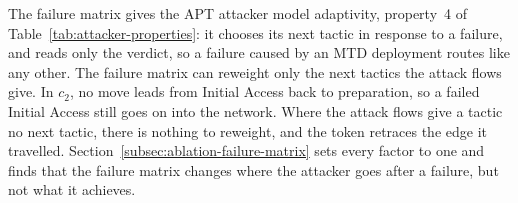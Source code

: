 \documentclass{cshonours}
\begin{document}
The failure matrix gives the APT attacker model adaptivity, property~4 of
Table~\ref{tab:attacker-properties}: it chooses its next tactic in response
to a failure, and reads only the verdict, so a failure caused by an MTD
deployment routes like any other. The
failure matrix can reweight only the next tactics the attack flows give. In
$c_2$, no move leads from Initial Access back to preparation, so a failed
Initial Access still goes on into the network. Where the attack flows give
a tactic no next tactic, there is nothing to reweight, and the
token retraces the edge it travelled. Section~\ref{subsec:ablation-failure-matrix} sets
every factor to one and finds that the failure matrix changes where the
attacker goes after a failure, but not what it achieves.

\end{document}
